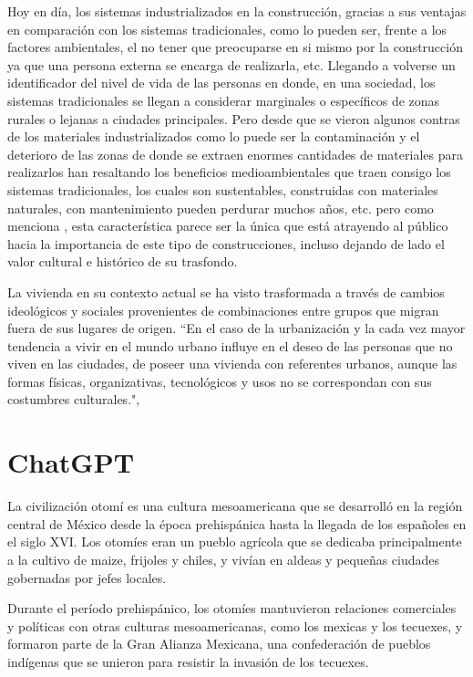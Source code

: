 Hoy en día, los sistemas industrializados en la construcción, gracias a sus ventajas en comparación con los sistemas tradicionales, como lo pueden ser, frente a los factores ambientales, el no tener que preocuparse en si mismo por la construcción ya que una persona externa se encarga de realizarla, etc. Llegando a volverse un identificador del nivel de vida de las personas en donde, en una sociedad, los sistemas tradicionales se llegan a considerar marginales o específicos de zonas rurales o lejanas a ciudades principales. Pero desde que se vieron algunos contras de los materiales industrializados como lo puede ser la contaminación y el deterioro de las zonas de donde se extraen enormes cantidades de materiales para realizarlos han resaltando los beneficios medioambientales que traen consigo los sistemas tradicionales, los cuales son sustentables, construidas con materiales naturales, con mantenimiento pueden perdurar muchos años, etc. pero como menciona \citep{gandara2000}, esta característica parece ser la única que está atrayendo al público hacia la importancia de este tipo de construcciones, incluso dejando de lado el valor cultural e histórico de su trasfondo.

La vivienda en su contexto actual se ha visto trasformada a través de cambios ideológicos y sociales provenientes de combinaciones entre grupos que migran fuera de sus lugares de origen. ``En el caso de la urbanización y la cada vez mayor tendencia a vivir en el mundo urbano influye en el deseo de las personas que no viven en las ciudades, de poseer una vivienda con referentes urbanos, aunque las formas físicas, organizativas, tecnológicos y usos no se correspondan con sus costumbres culturales."\citep{alvarez2003maguey},

\section{ChatGPT}
La civilización otomí es una cultura mesoamericana que se desarrolló en la región central de México desde la época prehispánica hasta la llegada de los españoles en el siglo XVI. Los otomíes eran un pueblo agrícola que se dedicaba principalmente a la cultivo de maize, frijoles y chiles, y vivían en aldeas y pequeñas ciudades gobernadas por jefes locales.

Durante el período prehispánico, los otomíes mantuvieron relaciones comerciales y políticas con otras culturas mesoamericanas, como los mexicas y los tecuexes, y formaron parte de la Gran Alianza Mexicana, una confederación de pueblos indígenas que se unieron para resistir la invasión de los tecuexes.

